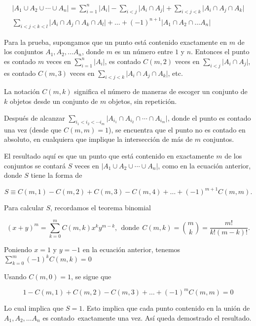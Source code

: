 \documentclass[a4paper,10pt]{report}
\begin{document}
\begin{align*}
\vert A_1 \cup A_2 \cup \cdots \cup A_n \vert = \sum_{i = 1}^{n}\vert A_i \vert - \sum_{i < j}^{}\vert A_i \cap A_j\vert + \sum_{i < j < k}^{}\vert A_i \cap A_j \cap A_k \vert \\
\sum_{i < j < k < l}^{}\vert A_i \cap A_j \cap A_k \cap A_l \vert  + \dots + (-1)^{n +1}\vert A_1 \cap A_2 \cap \dots A_n \vert
\end{align*}

\vspace{0.3cm}

Para la prueba, supongamos que un punto est\'a contenido exactamente en $m$ de los conjuntos $A_1, A_2, \dots A_n$, donde $m$ es un n\'umero entre $1$ y $n$. Entonces el punto es contado  $m$ veces en $\sum_{i = 1}^{n}\vert A_i \vert$, es contado $C(m,2)$ veces en $\sum_{i < j}^{}\vert A_i \cap A_j\vert$, es contado $C(m,3)$ veces en $\sum_{i < j< k}^{}\vert A_i \cap A_j \cap A_k \vert$, etc.

La notaci\'on $C(m,k)$ significa el n\'umero de maneras de	 escoger un conjunto de $k$ objetos desde un conjunto de $m$ objetos, sin repetici\'on.

\vspace{0.3cm}


Despu\'es de alcanzar $\sum_{i_1 < i_2 < \cdots i_m}\vert A_{i_1} \cap A_{i_2} \cap \cdots \cap A_{i_m}\vert$, donde el punto es contado una vez (desde que $C(m ,m) = 1$), se encuentra que el punto no es contado  en absoluto, en cualquiera que implique  la intersecci\'on de m\'as de $m$ conjuntos.

\vspace{0.3cm}


 El resultado aqu\'i  es que un punto que est\'a contenido en exactamente $m$ de los conjuntos se contar\'a $S$ veces en  $\vert A_1 \cup A_2 \cup \cdots \cup A_n \vert $, como en la ecuaci\'on anterior, donde $S$ tiene la forma de 

\[
S \equiv C(m,1)-C(m,2)+C(m, 3)-C(m,4) + \dots + (-1)^{m+1}C(m,m). 
\]

\vspace{0.3cm}

Para calcular $S$, recordamos el teorema binomial

\vspace{0.3cm}

\[
(x + y)^m = \sum_{k = 0}^{m} C(m, k)x^k y^{m -k}, \ \ \text{donde}\ \  C(m, k ) = \binom{m}{k} = \frac{m!}{k!( m - k)!}.
\]

\vspace{0.3cm}

Poniendo $x = 1$ y $y= -1$ en la ecuaci\'on anterior, tenemos $\sum_{k = 0}^{m}(-1)^kC(m, k) = 0$

\vspace{0.3cm}

Usando $C(m, 0) = 1$, se sigue que

\[
1- C(m,1) + C(m, 2) - C(m, 3) + \dots + (-1)^mC(m, m) = 0
\]

\vspace{0.3cm}

Lo cual implica que $S = 1$. Esto implica que cada punto contenido en la uni\'on de $A_1, A_2,\dots A_n$ es \mbox{contado exactamente} una vez. As\'i queda demostrado el resultado.
\end{document}
